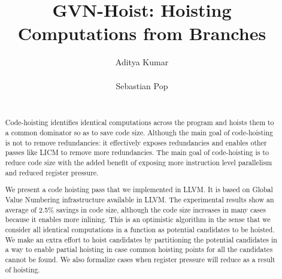 \documentclass{sig-alternate}
\begin{document}
\def \SCoP {SCoP}
\def \GCC {GCC}
\def \LLVM {LLVM}
\def \SESE {SESE}
\def \CFG {CFG}
\def \SSA {SSA}
\def \scev {scev}

\setlength{\pdfpageheight}{\paperheight}
\setlength{\pdfpagewidth}{\paperwidth}

\title{GVN-Hoist: Hoisting Computations from Branches}


\author{
\alignauthor
Aditya Kumar\\
       \\
\alignauthor
Sebastian Pop\\
       \\
}

\maketitle
\begin{abstract}
  Code-hoisting identifies identical computations across the program and hoists
  them to a common dominator so as to save code size.  Although the main goal of
  code-hoisting is not to remove redundancies: it effectively exposes
  redundancies and enables other passes like LICM to remove more redundancies.
  The main goal of code-hoisting is to reduce code size with the added benefit
  of exposing more instruction level parallelism and reduced register pressure.

  We present a code hoisting pass that we implemented in LLVM. It is based on
  Global Value Numbering infrastructure available in LLVM. The experimental
  results show an average of 2.5\% savings in code size, although the code size
  increases in many cases because it enables more inlining. This is an
  optimistic algorithm in the sense that we consider all identical computations
  in a function as potential candidates to be hoisted. We make an extra effort
  to hoist candidates by partitioning the potential candidates in a way to
  enable partial hoisting in case common hoisting points for all the candidates
  cannot be found. We also formalize cases when register pressure will reduce as
  a result of hoisting.
\end{abstract}
\end{document}
